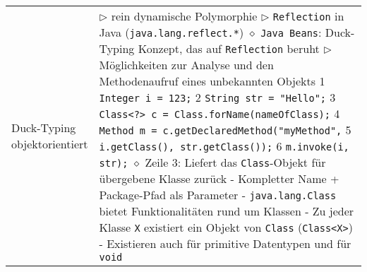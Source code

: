 \begin{longtable}{ | p{} p{} | }
	\makecell[l]{Duck-Typing \\ objektorientiert} & \makecell[l]{
	$\triangleright$ rein dynamische Polymorphie \\
	$\triangleright$ \texttt{Reflection} in Java (\texttt{java.lang.reflect.*}) \\
	\hspace{0.4cm} $\diamond$ \texttt{Java Beans}: Duck-Typing Konzept, das auf \texttt{Reflection} beruht \\
	$\triangleright$ Möglichkeiten zur Analyse und den Methodenaufruf eines unbekannten Objekts \\
	\hspace{0.4cm} 1 \hspace{0.1cm} \texttt{Integer i = 123;} \\
	\hspace{0.4cm} 2 \hspace{0.1cm} \texttt{String str = "Hello";} \\
	\hspace{0.4cm} 3 \hspace{0.1cm} \texttt{Class<?> c = Class.forName(nameOfClass);} \\
	\hspace{0.4cm} 4 \hspace{0.1cm} \texttt{Method m = c.getDeclaredMethod("myMethod",} \\
	\hspace{0.4cm} 5 \hspace{2.5cm} \texttt{i.getClass(), str.getClass());} \\
	\hspace{0.4cm} 6 \hspace{0.1cm} \texttt{m.invoke(i, str);} \\
	\hspace{0.4cm} $\diamond$ Zeile 3: Liefert das \texttt{Class}-Objekt für übergebene Klasse zurück\\
	\hspace{0.6cm} - Kompletter Name + Package-Pfad als Parameter \\
	\hspace{0.6cm} - \texttt{java.lang.Class} bietet Funktionalitäten rund um Klassen \\
	\hspace{0.6cm} - Zu jeder Klasse \texttt{X} existiert ein Objekt von \texttt{Class} (\texttt{Class<X>}) \\
	\hspace{0.6cm} - Existieren auch für primitive Datentypen und für \texttt{void}\\
}
\end{longtable}
